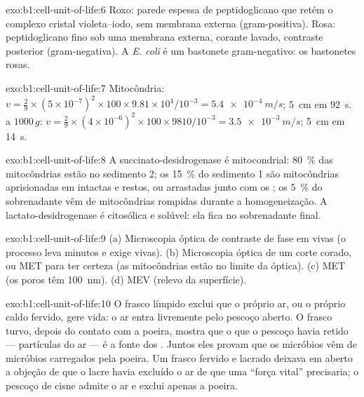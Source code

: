 \begin{solution}{exo:b1:cell-unit-of-life:6}
Roxo: parede espessa de peptidoglicano que retém o complexo cristal
violeta--iodo, sem membrana externa (gram-positiva). Rosa:
peptidoglicano fino sob uma membrana externa, corante lavado, contraste
posterior (gram-negativa). A \emph{E. coli} é um bastonete
gram-negativo: os bastonetes rosas.
\end{solution}

\begin{solution}{exo:b1:cell-unit-of-life:7}
Mitocôndria: $v = \frac{2}{9}\times(5\times 10^{-7})^2\times 100\times
9.81\times 10^4/10^{-3} = \qty{5.4e-4}{m/s}$; \qty{5}{cm} em
\qty{92}{s}.  a $1000\,g$: $v = \frac{2}{9}\times(4\times
10^{-6})^2\times 100\times 9810/10^{-3} = \qty{3.5e-3}{m/s}$;
\qty{5}{cm} em \qty{14}{s}.
\end{solution}

\begin{solution}{exo:b1:cell-unit-of-life:8}
A succinato-desidrogenase é mitocondrial: \qty{80}{\%} das mitocôndrias
estão no sedimento 2; os \qty{15}{\%} do sedimento 1 são mitocôndrias
aprisionadas em  intactas e restos, ou arrastadas junto com os
; os \qty{5}{\%} do sobrenadante vêm de mitocôndrias rompidas
durante a homogeneização. A lactato-desidrogenase é citosólica e
solúvel: ela fica no sobrenadante final.
\end{solution}

\begin{solution}{exo:b1:cell-unit-of-life:9}
(a) Microscopia óptica de contraste de fase em  vivas (o processo
leva minutos e exige  vivas). (b) Microscopia óptica de um corte
corado, ou MET para ter certeza (as mitocôndrias estão no limite da
óptica). (c) MET (os poros têm \qty{100}{nm}). (d) MEV (relevo da
superfície).
\end{solution}

\begin{solution}{exo:b1:cell-unit-of-life:10}
O frasco límpido exclui que o próprio ar, ou o próprio caldo fervido,
gere vida: o ar entra livremente pelo pescoço aberto. O frasco turvo,
depois do contato com a poeira, mostra que o que o pescoço havia retido
--- partículas do ar --- é a fonte dos . Juntos eles provam
que os micróbios vêm de micróbios carregados pela poeira. Um frasco
fervido e lacrado deixava em aberto a objeção de que o lacre havia
excluído o ar de que uma ``força vital'' precisaria; o pescoço de cisne
admite o ar e exclui apenas a poeira.
\end{solution}

